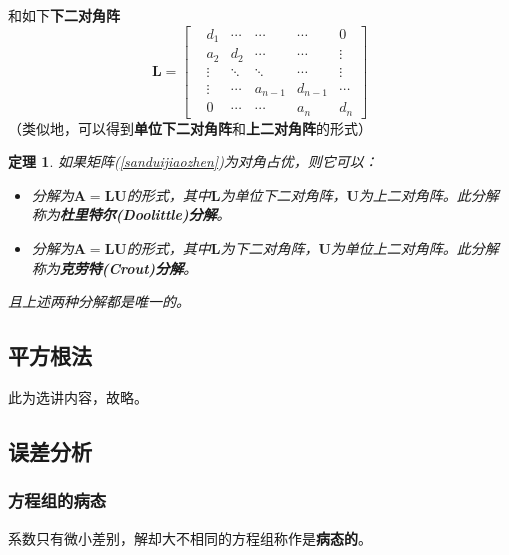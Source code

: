 \documentclass[fontset=ubuntu]{ctexart}
\newtheorem{theorem}{定理}
\numberwithin{equation}{section}
\numberwithin{theorem}{section}
\begin{document}
\begin{multicols}{2}
    和如下\textbf{下二对角阵}
    \begin{equation}
        \mathbf{L}=
        \begin{bmatrix}
            &d_1  &\cdots &\cdots &\cdots &0 \\ 
            &a_2 &d_2 &\cdots &\cdots &\vdots \\
            &\vdots &\ddots &\ddots &\cdots &\vdots \\
            &\vdots &\cdots &a_{n-1} &d_{n-1} &\cdots \\
            &0 &\cdots &\cdots &a_n &d_n
        \end{bmatrix}
    \end{equation}
    （类似地，可以得到\textbf{单位下二对角阵}和\textbf{上二对角阵}的形式）

    \begin{theorem}
        如果矩阵(\ref{sanduijiaozhen})为对角占优，则它可以：
        \begin{itemize}
            \item 分解为$\mathbf{A}=\mathbf{LU}$的形式，其中$\mathbf{L}$为单位下二对角阵，$\mathbf{U}$为上二对角阵。此分解称为\textbf{杜里特尔(Doolittle)分解}。
            \item 分解为$\mathbf{A}=\mathbf{LU}$的形式，其中$\mathbf{L}$为下二对角阵，$\mathbf{U}$为单位上二对角阵。此分解称为\textbf{克劳特(Crout)分解}。
        \end{itemize}
        且上述两种分解都是唯一的。
    \end{theorem}

    \subsection*{平方根法}

    此为选讲内容，故略。

    \subsection{误差分析}

    \subsubsection{方程组的病态}

    系数只有微小差别，解却大不相同的方程组称作是\textbf{病态的}。


\end{multicols}
\end{document}
